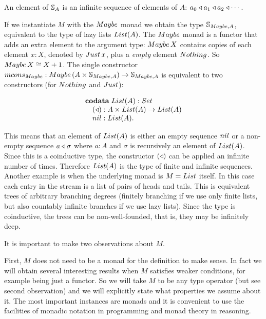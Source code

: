 An element of $\mathbb{S}_{A}$ is an infinite sequence of elements of $A$: $a_0 \triangleleft a_1\triangleleft a_2\triangleleft \cdots$.




If we instantiate $M$ with the $\maybe$ monad we obtain the type $\stream{\maybe,A}$, equivalent to the type of lazy lists $\lst{A}$.
The $\maybe$ monad is a functor that adds an extra element to the argument type:
$\maybe\,X$ contains copies of each element $x:X$, denoted by $\just\,x$, plus a {\em empty} element $\nothing$.
So $\maybe\,X \cong X+1$.
The single constructor $\mcons_\maybe: \maybe\,(A\times \stream{\maybe,A})\rightarrow\stream{\maybe,A}$ is equivalent to two constructors (for $\nothing$ and $\just$):

$$
\begin{array}[t]{l}
\codata\;
\lst{A}:\set\\
\quad (\scons): A\times \lst{A}\rightarrow\lst{A}\\
\quad \nil: \lst{A}.
\end{array}
$$

This means that an element of $\lst{A}$ is either an empty sequence $\nil$ or a non-empty sequence $a\triangleleft \sigma$ where $a:A$ and $\sigma$ is recursively an element of $\lst{A}$.
Since this is a coinductive type, the constructor $(\triangleleft)$ can be applied an infinite number of times.
Therefore $\lst{A}$ is the type of finite and infinite sequences. \\

Another example is when the underlying monad is $M = \lstsym $ itself.
In this case each entry in the stream is a list of pairs of heads and tails.
This is equivalent trees of arbitrary branching degrees (finitely branching if we use only finite lists, but also countably infinite branches if we use lazy lists).
Since the type is coinductive, the trees can be non-well-founded, that is, they may be infinitely deep.


It is important to make two observations about $M$.

First, $M$ does not need to be a monad for the definition to make sense. 
In fact we will obtain several interesting results when $M$ satisfies weaker conditions, for example being just a functor.
So we will take $M$ to be any type operator (but see second observation) and we will explicitly state what properties we assume about it.
The most important instances are monads and it is convenient to use the facilities of monadic notation in programming and monad theory in reasoning.

